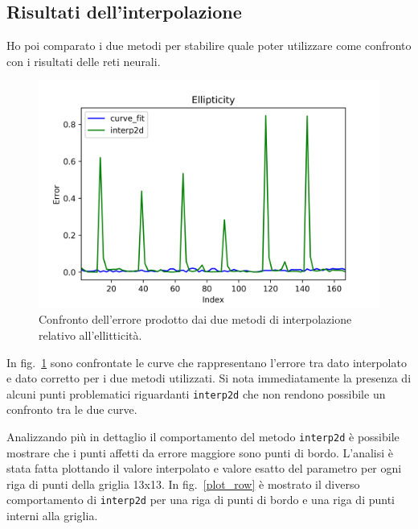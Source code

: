 \documentclass[12pt,a4paper,final]{book}
\begin{document}

\subsection{Risultati dell'interpolazione}\label{risultati_interpolazione}
Ho poi comparato i due metodi per stabilire quale poter utilizzare come confronto con i risultati delle reti neurali.
\begin{figure}[!ht]
	\centering
	\includegraphics[scale=0.8]{../figures/error_comparison_all.png}
	\caption{Confronto dell'errore prodotto dai due metodi di interpolazione relativo all'ellitticità.}
	\label{err_int}
\end{figure}
In fig.~\ref{err_int} sono confrontate le curve che rappresentano l'errore tra dato interpolato e dato corretto per i due metodi utilizzati. Si nota immediatamente la presenza di alcuni punti problematici riguardanti \texttt{interp2d} che non rendono possibile un confronto tra le due curve.


Analizzando più in dettaglio il comportamento del metodo \texttt{interp2d} è possibile mostrare che i punti affetti da errore maggiore sono punti di bordo. L'analisi è stata fatta plottando il valore interpolato e valore esatto del parametro per ogni riga di punti della griglia 13x13.
In fig.~\ref{plot_row} è mostrato il diverso comportamento di \texttt{interp2d} per una riga di punti di bordo e una riga di punti interni alla griglia.
\end{document}
